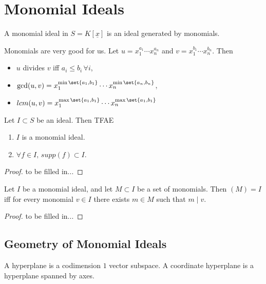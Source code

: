 \section{Monomial Ideals}

\begin{definition}
A monomial ideal in $S = K [ \underline{x}] $ is an ideal generated by monomials.
\end{definition}

\begin{remark}
Monomials are very good for us. Let $u = x_1^{a_1} \cdots x_n^{a_n}$ and $v = x_1^{b_1} \cdots x_n^{b_n}$. Then
\begin{itemize}
    \item $u $ divides $v$ iff $a_i \leq b_i \, \forall i$,
    \item $\gcd (u,v) = x_1^{\min \set{a_1 , b_1 }} \cdots x_n^{\min \set{a_n , b_n }}$,
    \item $lcm (u,v) = x_1^{\max \set{a_1 , b_1 }} \cdots x_n^{\max \set{a_1 , b_1 }}$
\end{itemize}
\end{remark}

\begin{theorem}
Let $I \subset S$ be an ideal. Then TFAE
\begin{enumerate}
    \item $I $ is a monomial ideal.
    \item $\forall f \in I, \, supp (f) \subset I$.
\end{enumerate}
\end{theorem}

\begin{proof}
to be filled in...
\end{proof}

\begin{corollary}
Let $I$ be a monomial ideal, and let $M \subset I$ be a set of monomials. Then $(M) = I$ iff for every monomial $v \in I$ there exists $m \in M$ such that $m \mid v$.
\end{corollary}

\begin{proof}
to be filled in...
\end{proof}


\subsection{Geometry of Monomial Ideals}

\begin{definition}
A hyperplane is a codimension $1$ vector subspace. A coordinate hyperplane is a hyperplane spanned by axes.
\end{definition}

